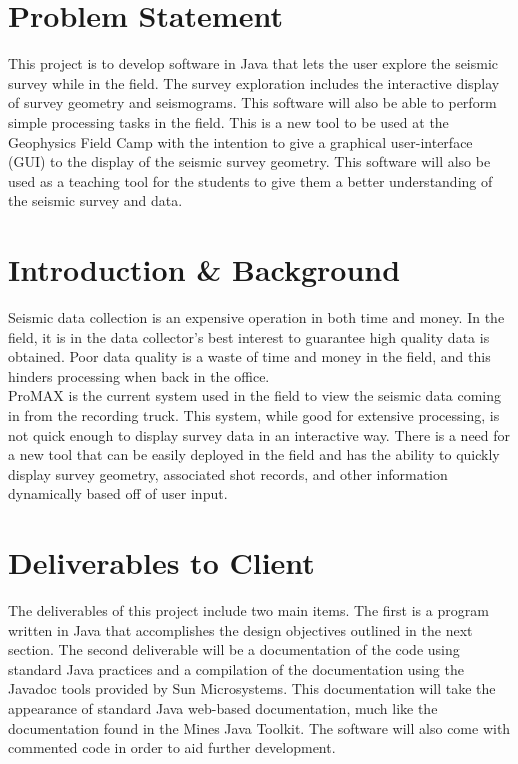 \documentclass[12pt]{article}
\begin{document}
\newpage
\tableofcontents
\listoffigures
\listoftables
\newpage

\section{Problem Statement}

This project is to develop software in Java that lets the user explore the seismic survey while in the field. The survey exploration includes the interactive display of survey geometry and seismograms. This software will also be able to perform simple processing tasks in the field. This is a new tool to be used at the Geophysics Field Camp with the intention to give a graphical user-interface (GUI) to the display of the seismic survey geometry. This software will also be used as a teaching tool for the students to give them a better understanding of the seismic survey and data.

\section{Introduction \& Background}

Seismic data collection is an expensive operation in both time and money. In the field, it is in the data collector's best interest to guarantee high quality data is obtained. Poor data quality is a waste of time and money in the field, and this hinders processing when back in the office. \\

ProMAX is the current system used in the field to view the seismic data coming in from the recording truck. This system, while good for extensive processing, is not quick enough to display survey data in an interactive way. There is a need for a new tool that can be easily deployed in the field and has the ability to quickly display survey geometry, associated shot records, and other information dynamically based off of user input.

\section{Deliverables to Client}

The deliverables of this project include two main items. The first is a program written in Java that accomplishes the design objectives outlined in the next section. The second deliverable will be a documentation of the code using standard Java practices and a compilation of the documentation using the Javadoc tools provided by Sun Microsystems. This documentation will take the appearance of standard Java web-based documentation, much like the documentation found in the Mines Java Toolkit. The software will also come with commented code in order to aid further development. 
\end{document}

